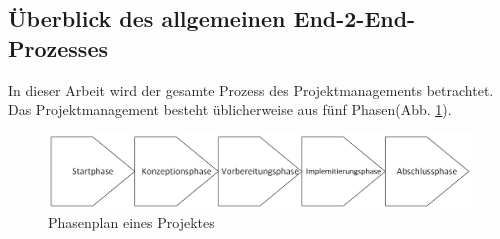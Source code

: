 \subsection{Überblick des allgemeinen End-2-End-Prozesses} %
In dieser Arbeit wird der gesamte Prozess des Projektmanagements betrachtet. Das Projektmanagement besteht üblicherweise aus fünf Phasen(Abb. \ref{Projektmanagment}).\cite{timinger2024modernes}
\begin{figure}[h!]
	\begin{center}
		\includegraphics[width=12cm]{Drawing.png}
		\caption{Phasenplan eines Projektes\cite{timinger2024modernes}}
		\label{Projektmanagment}
	\end{center}
	
\end{figure}

